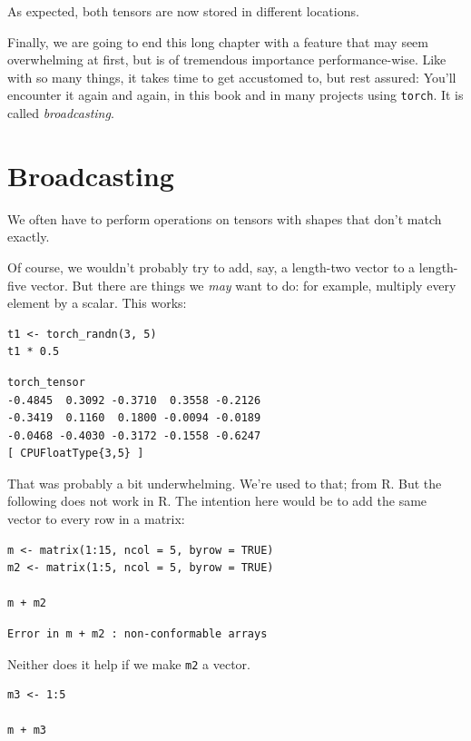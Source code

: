 \documentclass[
  letterpaper,
]{krantz}
\begin{document}
As expected, both tensors are now stored in different locations.

Finally, we are going to end this long chapter with a feature that may
seem overwhelming at first, but is of tremendous importance
performance-wise. Like with so many things, it takes time to get
accustomed to, but rest assured: You'll encounter it again and again, in
this book and in many projects using \texttt{torch}. It is called
\emph{broadcasting}.

\hypertarget{broadcasting}{%
\section{\texorpdfstring{Broadcasting}{Broadcasting}}\label{broadcasting}}

We often have to perform operations on tensors with shapes that don't
match exactly.

Of course, we wouldn't probably try to add, say, a length-two vector to
a length-five vector. But there are things we \emph{may} want to do: for
example, multiply every element by a scalar. This works:

\begin{verbatim}
t1 <- torch_randn(3, 5)
t1 * 0.5
\end{verbatim}

\begin{verbatim}
torch_tensor
-0.4845  0.3092 -0.3710  0.3558 -0.2126
-0.3419  0.1160  0.1800 -0.0094 -0.0189
-0.0468 -0.4030 -0.3172 -0.1558 -0.6247
[ CPUFloatType{3,5} ]
\end{verbatim}

That was probably a bit underwhelming. We're used to that; from R. But
the following does not work in R. The intention here would be to add the
same vector to every row in a matrix:

\begin{verbatim}
m <- matrix(1:15, ncol = 5, byrow = TRUE)
m2 <- matrix(1:5, ncol = 5, byrow = TRUE)

m + m2
\end{verbatim}

\begin{verbatim}
Error in m + m2 : non-conformable arrays
\end{verbatim}

Neither does it help if we make \texttt{m2} a vector.

\begin{verbatim}
m3 <- 1:5

m + m3
\end{verbatim}
\end{document}
